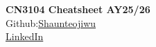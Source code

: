 \documentclass[9pt,a4paper]{article}
\begin{document}


\scriptsize

\begin{center}
\textbf{\Large CN3104 Cheatsheet AY25/26}\\
Github:\href{https://github.com/Shaunteojiwu?tab=repositories}{Shaunteojiwu}\\
\href{https://www.linkedin.com/in/shaun-teo-jiwu0824/}{LinkedIn} \\
\end{center}
\end{document}

